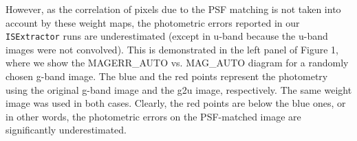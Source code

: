 \documentclass[apj,iop]{emulateapj}
\begin{document}
   However, as the correlation of pixels due to the PSF matching is not taken into account by these weight maps, the photometric errors reported in our {\tt ISExtractor} runs are underestimated (except in u-band because the u-band images were not convolved). This is demonstrated in the left panel of Figure 1, where we show the MAGERR\_AUTO vs. MAG\_AUTO diagram for a randomly chosen g-band image. The blue and the red points represent the photometry using the original g-band image and the g2u image, respectively. The same weight image was used in both cases. Clearly, the red points are below the blue ones, or in other words, the photometric errors on the PSF-matched image are significantly underestimated. 


\end{document}
